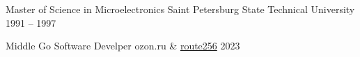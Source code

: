 
\eduEntry
  {Master of Science in Microelectronics}
  {Saint Petersburg State Technical University}
  {1991 -- 1997}

\eduEntry
  {Middle Go Software Develper}
  {ozon.ru \& \href{https://route256.ozon.ru/}{route256}}
  {2023}